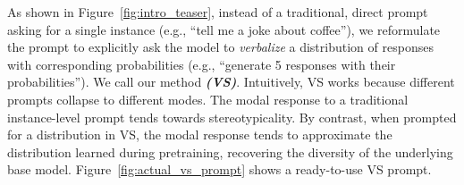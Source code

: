 As shown in Figure~\ref{fig:intro_teaser},  instead of a traditional, direct prompt asking for a single instance (e.g., ``tell me a joke about coffee''), we reformulate the prompt to explicitly ask the model to \emph{verbalize} a distribution of responses with corresponding probabilities (e.g., ``generate 5 responses with their probabilities''). We call our method \textbf{\textit{\ours} \textit{(VS)}}. 
Intuitively, VS works because different prompts collapse to different modes. The modal response to a traditional instance-level prompt tends towards stereotypicality. By contrast, when prompted for a distribution in VS, the modal response tends to approximate the distribution learned during pretraining, recovering the diversity of the underlying base model. Figure~\ref{fig:actual_vs_prompt} shows a ready-to-use VS prompt. 

%


